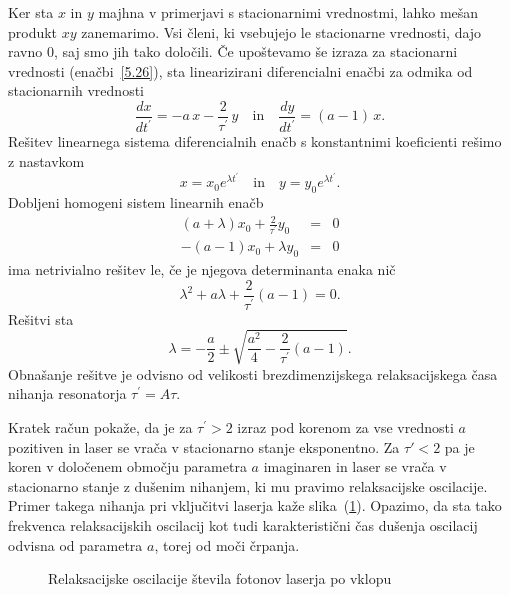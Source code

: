 Ker sta $x$ in $y$ majhna v primerjavi s stacionarnimi vrednostmi, lahko
mešan produkt $xy$ zanemarimo. Vsi členi, ki vsebujejo le stacionarne vrednosti,
dajo ravno 0, saj smo jih tako določili. Če upoštevamo še izraza 
za stacionarni vrednosti (enačbi~\ref{5.26}), 
sta linearizirani diferencialni enačbi za odmika od stacionarnih vrednosti 
\begin{equation}
\frac{dx}{dt^{\prime }} =-a\,x-\frac{2}{\tau ^{\prime }}\,y   \quad \mathrm{in} \quad
\frac{dy}{dt^{\prime }} =(a-1)\,x.
\label{5.28}
\end{equation}
Rešitev linearnega sistema diferencialnih enačb s konstantnimi
koeficienti rešimo z nastavkom  
\begin{equation}
x=x_{0}e^{\lambda t^{\prime }} \quad \mathrm{in} \quad 
y=y_{0}e^{\lambda t^{\prime }}.
\label{5.29}
\end{equation}
Dobljeni homogeni sistem linearnih enačb 
\begin{eqnarray}
(a+\lambda )x_{0}+\frac{2}{\tau ^{\prime }}y_{0} &=&0  \label{5.30} \\
-(a-1)x_{0}+\lambda y_{0} &=&0
\end{eqnarray}
ima netrivialno rešitev le, če je njegova determinanta enaka nič
\begin{equation}
\lambda ^{2}+a\lambda +\frac{2}{\tau ^{\prime }}(a-1)=0.  
\label{5.301}
\end{equation}
Rešitvi sta 
\begin{equation}
\lambda =-\frac{a}{2}\pm \sqrt{\frac{a^{2}}{4}-\frac{2}{\tau ^{\prime }}(a-1)}.
\label{5.31}
\end{equation}
Obnašanje rešitve je odvisno od velikosti brezdimenzijskega relaksacijskega
časa nihanja resonatorja $\tau ^{\prime }=A\tau $. 

Kratek račun pokaže, da je 
za $\tau ^{\prime }>2$ izraz pod korenom za vse vrednosti $a$ pozitiven in laser 
se vrača v stacionarno stanje eksponentno. Za $\tau' <2$ pa je koren v določenem območju
parametra $a$ imaginaren in laser se vrača v stacionarno stanje z
dušenim nihanjem, ki mu pravimo relaksacijske oscilacije. 
Primer takega nihanja 
pri vključitvi laserja kaže slika~(\ref{fig:relax}). Opazimo, da sta tako 
frekvenca relaksacijskih oscilacij kot tudi karakteristični čas dušenja oscilacij
odvisna od parametra $a$, torej od moči črpanja.
\begin{figure}[h]
\centering
\def\svgwidth{90truemm} 

\caption{Relaksacijske oscilacije števila fotonov laserja po vklopu}
\label{fig:relax}
\end{figure}

